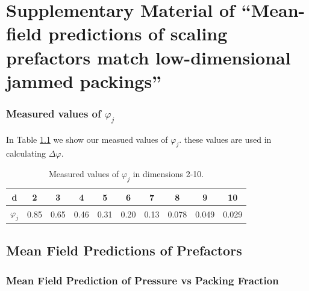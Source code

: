 
\chapter{Supplementary Material of ``Mean-field predictions of scaling prefactors match low-dimensional jammed packings''}
\author{James D Sartor, Sean A. Ridout, Eric I. Corwin}

\label{excessContactsScalingSupplement}

\subsection{Measured values of $\varphi_j$}
In Table \ref{table:phij} we show our measued values of $\varphi_j$. these values are used in calculating $\Delta \varphi$.

\begin{table}[ht]
\caption{Measured values of $\varphi_j$ in dimensions 2-10.
\label{table:phij}}
\begin{tabular}{ |c|c|c|c|c|c|c|c|c|c| } 
 \hline
 d & 2 & 3 & 4 & 5 & 6 & 7 & 8 & 9 & 10 \\ 
 \hline
 $\varphi_j$ & 0.85 & 0.65 & 0.46 & 0.31 & 0.20 & 0.13 & 0.078 & 0.049 & 0.029\\ 
 \hline
\end{tabular}
\end{table}

\section{Mean Field Predictions of Prefactors}

\subsection{Mean Field Prediction of Pressure vs Packing Fraction}

